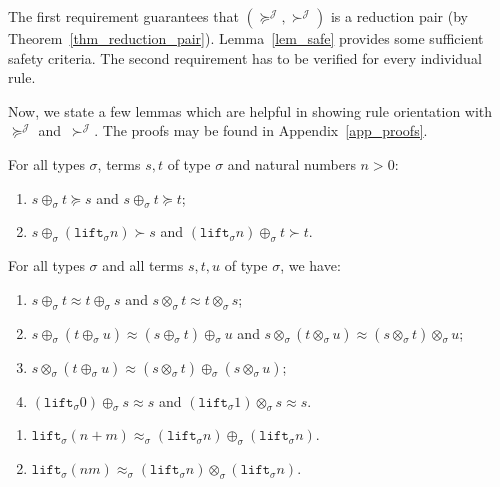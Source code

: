 \documentclass[a4paper,UKenglish,cleveref,autoref,numberwithinsect]{lipics-v2019}
\theoremstyle{definition}
\newcommand{\lift}{\mathtt{lift}}
\newcommand{\Termmap}{\mathcal{J}}
\newcommand{\succinterpret}{\succ^{\Termmap}}
\newcommand{\succeqinterpret}{\succeq^{\Termmap}}
\begin{document}
The first requirement guarantees that
$(\succeqinterpret,\succinterpret)$ is a reduction pair (by
Theorem~\ref{thm_reduction_pair}). Lemma~\ref{lem_safe} provides some
sufficient safety criteria. The second requirement has to be verified
for every individual rule.

Now, we state a few lemmas which are helpful in showing rule
orientation with~$\succeqinterpret$ and~$\succinterpret$. The proofs
may be found in Appendix~\ref{app_proofs}.

\begin{lemma}\label{lem:plusparts}
For all types $\sigma$, terms $s,t$ of type $\sigma$ and natural
numbers $n > 0$:
\begin{enumerate}
\item $s \oplus_{\sigma} t \succeq s$ and $s \oplus_{\sigma} t \succeq
  t$;
\item $s \oplus_{\sigma} (\lift_{\sigma} n) \succ s$ and
  $(\lift_{\sigma} n) \oplus_{\sigma} t \succ t$.
\end{enumerate}
\end{lemma}

\begin{lemma}\label{lem:approxproperties}
For all types $\sigma$ and all terms $s,t,u$ of type $\sigma$, we
have:
\begin{enumerate}
\item\label{lem:approx:symmetry} $s \oplus_\sigma t \approx t
  \oplus_\sigma s$ and $s \otimes_\sigma t \approx t \otimes_\sigma
  s$;
\item\label{lem:approx:assoc} $s \oplus_\sigma (t \oplus_\sigma u)
  \approx (s \oplus_\sigma t) \oplus_\sigma u$ and $s \otimes_\sigma
  (t \otimes_\sigma u) \approx (s \otimes_\sigma t) \otimes_\sigma u$;
\item\label{lem:approx:distribution} $s \otimes_\sigma (t
  \oplus_\sigma u) \approx (s \otimes_\sigma t) \oplus_\sigma (s
  \otimes_\sigma u)$;
\item\label{lem:approx:neutral} $(\lift_\sigma 0) \oplus_\sigma s
  \approx s$ and $(\lift_\sigma 1) \otimes_\sigma s \approx s$.
\end{enumerate}
\end{lemma}

\begin{lemma}\label{lem_lift_approx}
  \begin{enumerate}
  \item $\lift_\sigma(n+m) \approx_\sigma (\lift_\sigma n)
    \oplus_\sigma (\lift_\sigma n)$.
  \item $\lift_\sigma(n m) \approx_\sigma (\lift_\sigma n)
    \otimes_\sigma (\lift_\sigma n)$.
  \end{enumerate}
\end{lemma}
\end{document}
